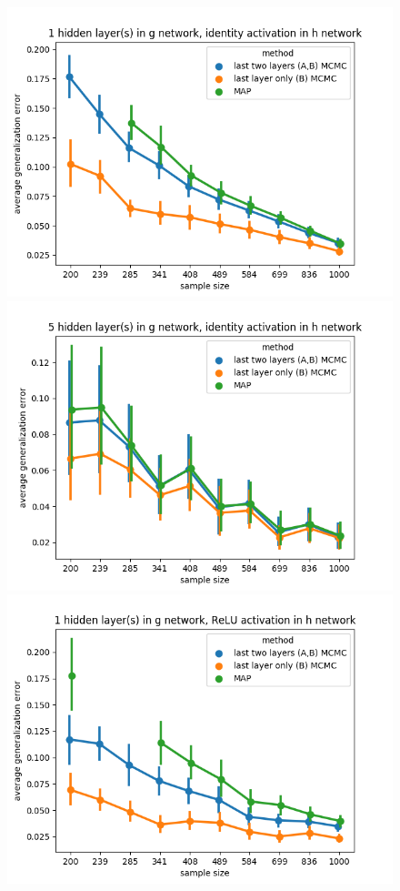\documentclass{article} %
\begin{document}
\begin{figure}[h]
	\begin{center}
		\includegraphics[scale=0.4]{taskid4.png}
		\includegraphics[scale=0.4]{taskid5.png}
		\includegraphics[scale=0.4]{taskid6.png}

\end{center}
\end{figure}
\end{document}
